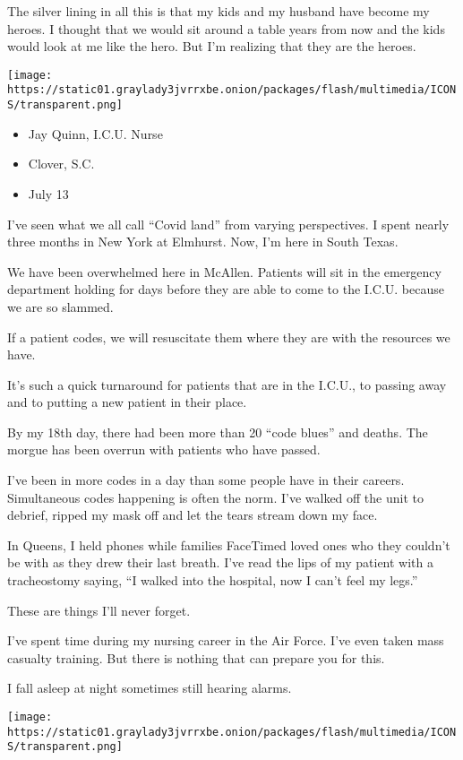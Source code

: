 The silver lining in all this is that my kids and my husband have become
my heroes. I thought that we would sit around a table years from now and
the kids would look at me like the hero. But I'm realizing that they are
the heroes.

\texttt{[image: https://static01.graylady3jvrrxbe.onion/packages/flash/multimedia/ICONS/transparent.png]}

\begin{itemize}
\tightlist
\item
  Jay Quinn, I.C.U. Nurse
\item
  Clover, S.C.
\item
  July 13
\end{itemize}

I've seen what we all call ``Covid land'' from varying perspectives. I
spent nearly three months in New York at Elmhurst. Now, I'm here in
South Texas.

We have been overwhelmed here in McAllen. Patients will sit in the
emergency department holding for days before they are able to come to
the I.C.U. because we are so slammed.

If a patient codes, we will resuscitate them where they are with the
resources we have.

It's such a quick turnaround for patients that are in the I.C.U., to
passing away and to putting a new patient in their place.

By my 18th day, there had been more than 20 ``code blues'' and deaths.
The morgue has been overrun with patients who have passed.

I've been in more codes in a day than some people have in their careers.
Simultaneous codes happening is often the norm. I've walked off the unit
to debrief, ripped my mask off and let the tears stream down my face.

In Queens, I held phones while families FaceTimed loved ones who they
couldn't be with as they drew their last breath. I've read the lips of
my patient with a tracheostomy saying, ``I walked into the hospital, now
I can't feel my legs.''

These are things I'll never forget.

I've spent time during my nursing career in the Air Force. I've even
taken mass casualty training. But there is nothing that can prepare you
for this.

I fall asleep at night sometimes still hearing alarms.

\texttt{[image: https://static01.graylady3jvrrxbe.onion/packages/flash/multimedia/ICONS/transparent.png]}

